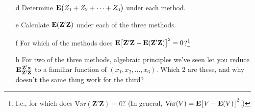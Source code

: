 \documentclass{article}
\begin{document}
\begin{enumerate}
\begin{minipage}{.45\linewidth}
\begin{itemize}
\item[d] Determine $\mathbf{E}\big(  Z_{1} + Z_{2} + \cdots + Z_{6} \big)$ under each method.
\item[e] Calculate $\mathbf{E}(\mathbf{Z}'\mathbf{Z})$ under each of the three methods.
\end{itemize}
\end{minipage}
% 
\begin{minipage}{.45\linewidth}
  \begin{itemize}
 \item[f] For which of the methods does $\mathbf{E}
  \big[\mathbf{Z}'\mathbf{Z} -\mathbf{E} (\mathbf{Z}'\mathbf{Z})\big]^{2} =
  0$?\footnote{I.e., for which does
    $\mathrm{Var}(\mathbf{Z}'\mathbf{Z}) = 0$?  (In general,
    $\mathrm{Var}(V) = \mathbf{E} \big[V - \mathbf{E}(V) \big]^{2} $.)}
\item[h] For two of the three methods, algebraic principles we've seen
  let you reduce
  $\mathbf{E} \frac{\mathbf{Z}'\mathbf{x}}{\mathbf{Z}'\mathbf{Z}}$ to a
  familiar function of $(x_{1}, x_{2}, \ldots, x_{6}) $.  Which 2 are
  these, and why doesn't the same thing work for the third?

  \end{itemize}
\end{minipage}
\end{enumerate}
\end{document}

